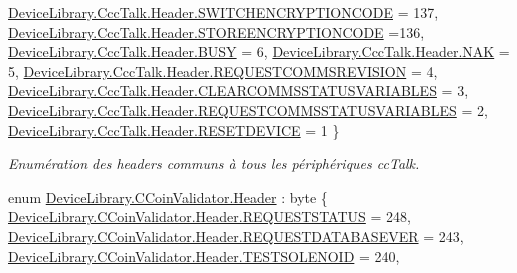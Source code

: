 \begin{DoxyCompactItemize}
\mbox{\hyperlink{group___header_gga22f8eb6526627d4203e53ce7dbd3052aa7179596553bfb00fe3a54fb1c4f46d2e}{Device\+Library.\+Ccc\+Talk.\+Header.\+S\+W\+I\+T\+C\+H\+E\+N\+C\+R\+Y\+P\+T\+I\+O\+N\+C\+O\+DE}} = 137, 
\newline
\mbox{\hyperlink{group___header_gga22f8eb6526627d4203e53ce7dbd3052aa175f64a90ae2bf6edd145a17609268a1}{Device\+Library.\+Ccc\+Talk.\+Header.\+S\+T\+O\+R\+E\+E\+N\+C\+R\+Y\+P\+T\+I\+O\+N\+C\+O\+DE}} =136, 
\mbox{\hyperlink{group___header_gga22f8eb6526627d4203e53ce7dbd3052aa802706a9238e2928077f97736854bad4}{Device\+Library.\+Ccc\+Talk.\+Header.\+B\+U\+SY}} = 6, 
\mbox{\hyperlink{group___header_gga22f8eb6526627d4203e53ce7dbd3052aa3860aef5aa76641c6959d1a5de94b216}{Device\+Library.\+Ccc\+Talk.\+Header.\+N\+AK}} = 5, 
\mbox{\hyperlink{group___header_gga22f8eb6526627d4203e53ce7dbd3052aa233ae98d8a18c499eb4b798360aa02ef}{Device\+Library.\+Ccc\+Talk.\+Header.\+R\+E\+Q\+U\+E\+S\+T\+C\+O\+M\+M\+S\+R\+E\+V\+I\+S\+I\+ON}} = 4, 
\newline
\mbox{\hyperlink{group___header_gga22f8eb6526627d4203e53ce7dbd3052aafb4cfb0ac631109fa01bdbd70ba8e166}{Device\+Library.\+Ccc\+Talk.\+Header.\+C\+L\+E\+A\+R\+C\+O\+M\+M\+S\+S\+T\+A\+T\+U\+S\+V\+A\+R\+I\+A\+B\+L\+ES}} = 3, 
\mbox{\hyperlink{group___header_gga22f8eb6526627d4203e53ce7dbd3052aaacaa18d8173ad7149b61185d29c4f3bb}{Device\+Library.\+Ccc\+Talk.\+Header.\+R\+E\+Q\+U\+E\+S\+T\+C\+O\+M\+M\+S\+S\+T\+A\+T\+U\+S\+V\+A\+R\+I\+A\+B\+L\+ES}} = 2, 
\mbox{\hyperlink{group___header_gga22f8eb6526627d4203e53ce7dbd3052aab87acc3ce509b6e2b20a564607eb06d8}{Device\+Library.\+Ccc\+Talk.\+Header.\+R\+E\+S\+E\+T\+D\+E\+V\+I\+CE}} = 1
 \}
\begin{DoxyCompactList}\small\item\em Enumération des headers communs à tous les périphériques cc\+Talk. \end{DoxyCompactList}\item 
enum \mbox{\hyperlink{group___header_ga5672baec375c16b1ec7bdb4b85cebaa9}{Device\+Library.\+C\+Coin\+Validator.\+Header}} \+: byte \{ \newline
\mbox{\hyperlink{group___header_gga5672baec375c16b1ec7bdb4b85cebaa9a9ce2b30cbcbda60f1a4e9d2cd5526d20}{Device\+Library.\+C\+Coin\+Validator.\+Header.\+R\+E\+Q\+U\+E\+S\+T\+S\+T\+A\+T\+US}} = 248, 
\mbox{\hyperlink{group___header_gga5672baec375c16b1ec7bdb4b85cebaa9a085cadf3ee4fec13527da4cbdb2f9e0c}{Device\+Library.\+C\+Coin\+Validator.\+Header.\+R\+E\+Q\+U\+E\+S\+T\+D\+A\+T\+A\+B\+A\+S\+E\+V\+ER}} = 243, 
\mbox{\hyperlink{group___header_gga5672baec375c16b1ec7bdb4b85cebaa9add5d1a1bac3f18225ae7c4dd94fbbec1}{Device\+Library.\+C\+Coin\+Validator.\+Header.\+T\+E\+S\+T\+S\+O\+L\+E\+N\+O\+ID}} = 240, 

\end{DoxyCompactItemize}
